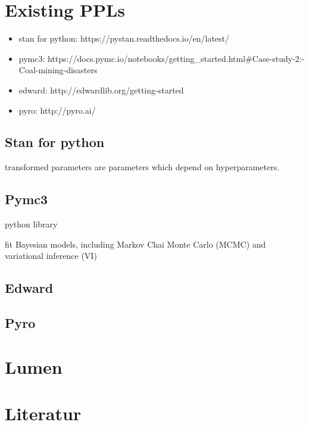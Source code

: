 \documentclass{article}
\begin{document}

\section{Existing PPLs}

\begin{itemize}
     \item stan for python: https://pystan.readthedocs.io/en/latest/
    \item pymc3: https://docs.pymc.io/notebooks/getting\_started.html\#Case-study-2:-Coal-mining-disasters
    \item edward: http://edwardlib.org/getting-started
    \item pyro: http://pyro.ai/
\end{itemize}

\subsection{Stan for python}

transformed parameters are parameters which depend on hyperparameters.

\subsection{Pymc3}

python library

fit Bayesian models, including Markov Chai Monte Carlo (MCMC) and variational inference (VI)


\subsection{Edward}

\subsection{Pyro}


\section{Lumen}

\listoffigures
        
\section{Literatur}



\end{document}
